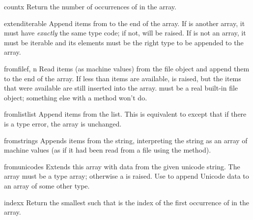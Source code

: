 \begin{methoddesc}[array]{count}{x}
Return the number of occurrences of  in the array.
\end{methoddesc}

\begin{methoddesc}[array]{extend}{iterable}
Append items from  to the end of the array.  If
 is another array, it must have \emph{exactly} the same
type code; if not,  will be raised.  If
 is not an array, it must be iterable and its
elements must be the right type to be appended to the array.
\end{methoddesc}

\begin{methoddesc}[array]{fromfile}{f, n}
Read  items (as machine values) from the file object 
and append them to the end of the array.  If less than  items
are available,  is raised, but the items that were
available are still inserted into the array.   must be a real
built-in file object; something else with a  method won't
do.
\end{methoddesc}

\begin{methoddesc}[array]{fromlist}{list}
Append items from the list.  This is equivalent to
except that if there is a type error, the array is unchanged.
\end{methoddesc}

\begin{methoddesc}[array]{fromstring}{s}
Appends items from the string, interpreting the string as an
array of machine values (as if it had been read from a
file using the  method).
\end{methoddesc}

\begin{methoddesc}[array]{fromunicode}{s}
Extends this array with data from the given unicode string.  The array
must be a type  array; otherwise a 
is raised.  Use  to
append Unicode data to an array of some other type.
\end{methoddesc}

\begin{methoddesc}[array]{index}{x}
Return the smallest  such that  is the index of
the first occurrence of  in the array.
\end{methoddesc}

